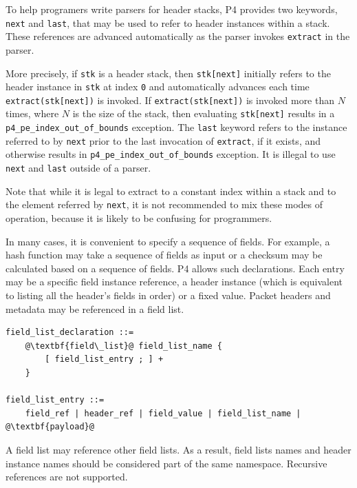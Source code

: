 \documentclass[12pt]{article}
\begin{document}
To help programers write parsers for header stacks, P4 provides two
keywords, \texttt{next} and \texttt{last}, that may be used to refer
to header instances within a stack. These references are advanced
automatically as the parser invokes \texttt{extract} in the parser.

More precisely, if \texttt{stk} is a header stack, then
\texttt{stk[next]} initially refers to the header instance in
\texttt{stk} at index \texttt{0} and automatically advances
each time \texttt{extract(stk[next])} is invoked. If
\texttt{extract(stk[next])} is invoked more than $N$ times, where $N$
is the size of the stack, then evaluating \texttt{stk[next]} results
in a \texttt{p4_pe_index_out_of_bounds} exception. The \texttt{last}
keyword refers to the instance referred to by \texttt{next} prior to
the last invocation of \texttt{extract}, if it exists, and otherwise
results in \texttt{p4_pe_index_out_of_bounds} exception. It is illegal
to use \texttt{next} and \texttt{last} outside of a parser.
    
Note that while it is legal to extract to a constant index within a
stack and to the element referred by \texttt{next}, it is not
recommended to mix these modes of operation, because it is likely to
be confusing for programmers.
    

In many cases, it is convenient to specify a sequence of fields. For example, 
a hash function may take a sequence of fields as input or a checksum may be 
calculated based on a sequence of fields.  P4 allows such declarations. Each 
entry may be a specific field instance reference, a header instance (which 
is equivalent to listing all the header's fields in order) or a fixed value. 
Packet headers and metadata may be referenced in a field list.

\begin{lstlisting}[frame=single,backgroundcolor=\color{bnfgreen},escapechar=\@]
field_list_declaration ::=
    @\textbf{field\_list}@ field_list_name {
        [ field_list_entry ; ] +
    }

field_list_entry ::= 
    field_ref | header_ref | field_value | field_list_name | @\textbf{payload}@
\end{lstlisting}


A field list may reference other field lists. As a result, field lists names 
and header instance names should be considered part of the same namespace. 
Recursive references are not supported.
\end{document}

